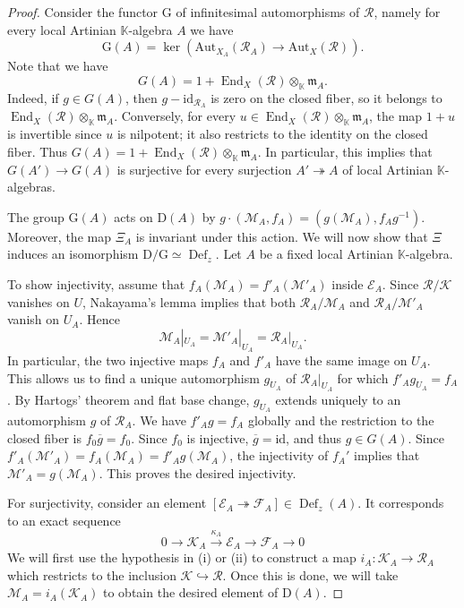 \documentclass[leqno,11pt,a4paper]{amsart}
\theoremstyle{definition}
\numberwithin{equation}{section}
\newcommand{\kk}{\mathbb{K}}
\newcommand{\mfm}{\mathfrak{m}}
\newcommand{\EE}{\mathscr{E}}
\newcommand{\FF}{\mathscr{F}}
\newcommand{\MM}{\mathscr{M}}
\newcommand{\RR}{\mathscr{R}}
\newcommand{\KK}{\mathscr{K}}
\DeclareMathOperator{\End}{End}
\DeclareMathOperator{\Def}{Def}
\begin{document}
\begin{proof}
Consider the functor $\mathrm{G}$ of infinitesimal automorphisms of $\RR$, namely for every local Artinian $\kk$-algebra $A$ we have
$$
\mathrm{G}(A)= \ker(\mathrm{Aut}_{X_A}(\RR_A) \to \mathrm{Aut}_X(\RR)).
$$
Note that we have
$$
G(A)=1+\End_X(\RR) \otimes_\kk \mfm_A.
$$
Indeed, if $g\in G(A)$, then $g-\mathrm{id}_{\RR_A}$ is zero on the closed fiber, so it belongs to $\End_X(\RR)\otimes_\kk\mfm_A$.
Conversely, for every $u\in\End_X(\RR)\otimes_\kk\mfm_A$, the map $1+u$ is invertible since $u$ is nilpotent; it also restricts to the identity on the closed fiber.
Thus $G(A)=1+\End_X(\RR)\otimes_\kk\mfm_A$.
In particular, this implies that $G(A')\to G(A)$ is surjective for every surjection $A' \twoheadrightarrow A$ of local Artinian $\kk$-algebras.

The group $\mathrm{G}(A)$ acts on $\mathrm{D}(A)$ by $g\cdot(\MM_A,f_A) =(g(\MM_A),f_Ag^{-1})$. Moreover, the map $\Xi_A$ is invariant under this action. 
We will now show that $\Xi$ induces an isomorphism $\mathrm{D}/\mathrm{G} \simeq \Def_z$.  
Let $A$ be a fixed local Artinian $\kk$-algebra.

To show injectivity, assume that $f_A(\MM_A)=f'_A(\MM'_A)$ inside $\EE_A$.
Since $\RR/\KK$ vanishes on $U$, Nakayama's lemma implies that both $\RR_A/\MM_A$ and $\RR_A/\MM'_A$ vanish on $U_A$. 
Hence
$$
\MM_A|_{U_A}=\MM'_A|_{U_A}=\RR_A|_{U_A}.
$$
In particular, the two injective maps $f_A$ and $f'_A$ have the same image on $U_A$.
This allows us to find a unique automorphism $g_{U_A}$ of $\RR_A|_{U_A}$ for which $f'_A g_{U_A}=f_A$.
By Hartogs' theorem and flat base change, $g_{U_A}$ extends uniquely to an automorphism $g$ of $\RR_A$.
We have $f'_A g=f_A$ globally and the restriction to the closed fiber is $f_0\overline{g} = f_0$.
Since $f_0$ is injective, $\overline{g}=\mathrm{id}$, and thus $g\in G(A)$.
Since $f'_A(\MM'_A) = f_A(\MM_A) = f'_Ag(\MM_A)$, the injectivity of $f_A'$ implies that $\MM'_A = g(\MM_A)$. 
This proves the desired injectivity.

For surjectivity, consider an element $[\EE_A \twoheadrightarrow \FF_A] \in \Def_z(A)$. It corresponds to 
an exact sequence
$$
0\longrightarrow \KK_A \xrightarrow{\kappa_A} \EE_A \longrightarrow\FF_A \longrightarrow 0
$$
We will first use the hypothesis in (i) or (ii) to construct a map $i_A: \KK_A \to \RR_A$ which restricts to the  inclusion $\KK\hookrightarrow\RR$.
Once this is done, we will take $\MM_A=i_A(\KK_A)$ to obtain the desired element of $\mathrm{D}(A)$.


\end{proof}
\end{document}
